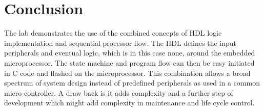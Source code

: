 \section{Conclusion}\label{sec: Conclusion}
The lab demonstrates the use of the combined concepts of HDL logic implementation and sequential processor flow. The HDL defines the input peripherals and eventual logic, which is in this case none, around the embedded microprocessor. The state machine and program flow can then be easy initiated in C code and flashed on the microprocessor. This combination allows a broad spectrum of system design instead of predefined peripherals as used in a common micro-controller. A draw back is it adds complexity and a further step of development which might add complexity in maintenance and life cycle control.




